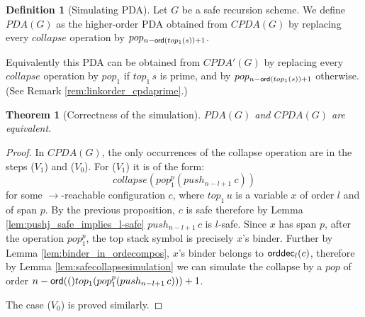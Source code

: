 \documentclass[a4paper,draft]{article}
\newtheorem{theorem}{Theorem}[section]
\theoremstyle{remark}
\theoremstyle{definition}
\newtheorem{definition}{Definition}[section]
\newcommand\orddec{{\sf orddec}}
\begin{document}
\begin{definition}[Simulating PDA]
Let $G$ be a safe recursion scheme.
We define $PDA(G)$ as the higher-order PDA obtained from
$CPDA(G)$ by replacing 
every $collapse$ operation by $pop_{n-{\sf ord}(top_1(s))+1}$.
\end{definition}
Equivalently this PDA can be obtained from $CPDA'(G)$ by replacing 
every $collapse$ operation by $pop_1$ if $top_1\, s$ is prime, and by $pop_{n-{\sf ord}(top_1(s))+1}$ otherwise. (See Remark \ref{rem:linkorder_cpdaprime}.)
\begin{theorem}[Correctness of the simulation]
$PDA(G)$ and $CPDA(G)$ are equivalent.
\end{theorem}
\begin{proof}
In $CPDA(G)$, the only occurrences of the collapse operation are in the steps ($V_1$) and ($V_0$). For ($V_1$) it is of the form:
$$collapse(pop_1^p(push_{n-l+1}~c))$$
for some $\rightarrow$-reachable configuration $c$, where $top_1\,u$ is a variable $x$ of order $l$ and of span $p$.
By the previous proposition, $c$ is safe therefore by Lemma \ref{lem:pushj_safe_implies_l-safe} $push_{n-l+1}\, c$ is $l$-safe. Since $x$ has span $p$, after the operation $pop_1^p$, the top stack symbol is precisely $x$'s binder. Further by Lemma \ref{lem:binder_in_ordecompos}, $x$'s binder belongs to $\orddec_l(c)$, therefore
by Lemma \ref{lem:safecollapsesimulation} we can simulate the collapse by a $pop$ of order
$n-{\sf ord}(()top_1(pop_1^p(push_{n-l+1}\,c))) +1$.

The case ($V_0$) is proved similarly.
\end{proof}



\end{document}
